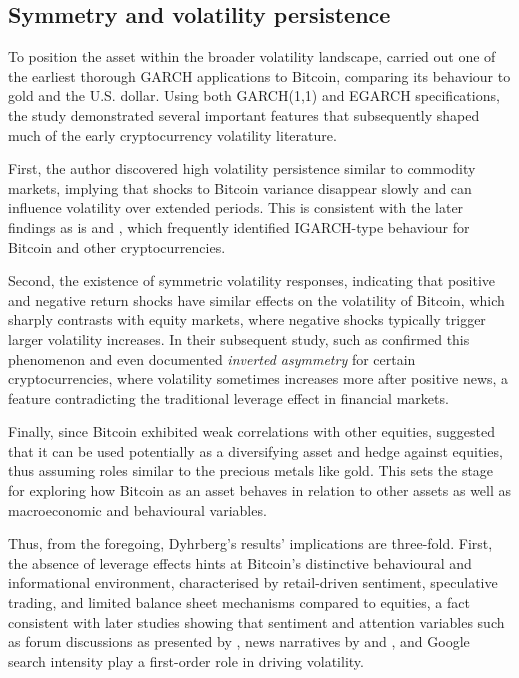 \documentclass[12pt]{report}
\begin{document}
\subsection{Symmetry and volatility persistence}
To position the asset within the broader volatility landscape, \cite{dyhrberg2016bitcoin} carried out one of the earliest thorough GARCH applications to Bitcoin, comparing its behaviour to gold and the U.S. dollar. Using both GARCH(1,1) and EGARCH specifications, the study demonstrated several important features that subsequently shaped much of the early cryptocurrency volatility literature.

First, the author discovered high volatility persistence similar to commodity markets, implying that  shocks to Bitcoin variance disappear slowly and can influence volatility over extended periods. This is consistent with the later findings as is \cite{chu2017garchcrypto} and \cite{katsiampa2017volatility}, which frequently identified IGARCH-type behaviour for Bitcoin and other cryptocurrencies.

Second, the existence of symmetric volatility responses, indicating that positive and negative return shocks have similar effects on the volatility of Bitcoin, which sharply contrasts with equity markets, where negative shocks typically trigger larger volatility increases. In their subsequent study, such as \cite{bencheikh2020stgarch} confirmed this phenomenon and even documented \textit{inverted asymmetry} for certain cryptocurrencies, where volatility sometimes increases more after positive news, a feature contradicting the traditional leverage effect in financial markets.

Finally, since Bitcoin exhibited weak correlations with other equities, \cite{dyhrberg2016bitcoin} suggested that it can be used potentially as a diversifying asset and hedge against equities, thus assuming roles similar to the precious metals like gold. This sets the stage for exploring how Bitcoin as an asset behaves in relation to other assets as well as macroeconomic and behavioural variables.

Thus, from the foregoing, Dyhrberg’s results' implications are three-fold. First, the absence of leverage effects hints at Bitcoin’s distinctive behavioural and informational environment, characterised by retail-driven sentiment, speculative trading, and limited balance sheet mechanisms compared to equities, a fact consistent with later studies showing that sentiment and attention variables such as forum discussions as presented by
\cite{mai2018silentmajority}, news narratives by \cite{sapkota2022newsbitcoin} and \cite{coulter2022media}, and Google search intensity play a first-order role in driving volatility.
\end{document}
